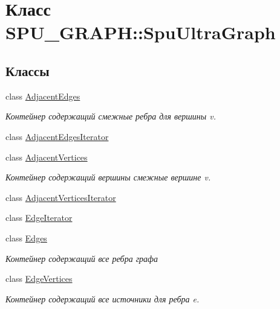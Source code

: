 \hypertarget{class_s_p_u___g_r_a_p_h_1_1_spu_ultra_graph}{}\section{Класс S\+P\+U\+\_\+\+G\+R\+A\+PH\+:\+:Spu\+Ultra\+Graph}
\label{class_s_p_u___g_r_a_p_h_1_1_spu_ultra_graph}
\subsection*{Классы}
\begin{DoxyCompactItemize}
\item 
class \hyperlink{class_s_p_u___g_r_a_p_h_1_1_spu_ultra_graph_1_1_adjacent_edges}{Adjacent\+Edges}
\begin{DoxyCompactList}\small\item\em Контейнер содержащий смежные ребра для вершины v. \end{DoxyCompactList}\item 
class \hyperlink{class_s_p_u___g_r_a_p_h_1_1_spu_ultra_graph_1_1_adjacent_edges_iterator}{Adjacent\+Edges\+Iterator}
\item 
class \hyperlink{class_s_p_u___g_r_a_p_h_1_1_spu_ultra_graph_1_1_adjacent_vertices}{Adjacent\+Vertices}
\begin{DoxyCompactList}\small\item\em Контейнер содержащий вершины смежные вершине v. \end{DoxyCompactList}\item 
class \hyperlink{class_s_p_u___g_r_a_p_h_1_1_spu_ultra_graph_1_1_adjacent_vertices_iterator}{Adjacent\+Vertices\+Iterator}
\item 
class \hyperlink{class_s_p_u___g_r_a_p_h_1_1_spu_ultra_graph_1_1_edge_iterator}{Edge\+Iterator}
\item 
class \hyperlink{class_s_p_u___g_r_a_p_h_1_1_spu_ultra_graph_1_1_edges}{Edges}
\begin{DoxyCompactList}\small\item\em Контейнер содержащий все ребра графа \end{DoxyCompactList}\item 
class \hyperlink{class_s_p_u___g_r_a_p_h_1_1_spu_ultra_graph_1_1_edge_vertices}{Edge\+Vertices}
\begin{DoxyCompactList}\small\item\em Контейнер содержащий все источники для ребра e. \end{DoxyCompactList}\item 

\end{DoxyCompactItemize}
